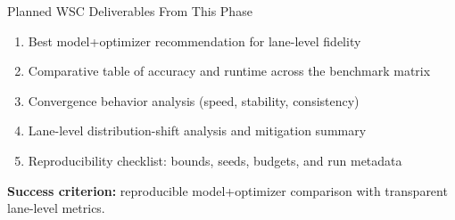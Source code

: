 \documentclass[aspectratio=169]{beamer}
\begin{document}
\begin{frame}{Planned WSC Deliverables From This Phase}
    \begin{enumerate}
        \item Best model+optimizer recommendation for lane-level fidelity
        \item Comparative table of accuracy and runtime across the benchmark matrix
        \item Convergence behavior analysis (speed, stability, consistency)
        \item Lane-level distribution-shift analysis and mitigation summary
        \item Reproducibility checklist: bounds, seeds, budgets, and run metadata
    \end{enumerate}

    \vspace{0.8em}
    \textbf{Success criterion:} reproducible model+optimizer comparison with transparent lane-level metrics.
\end{frame}
\end{document}
